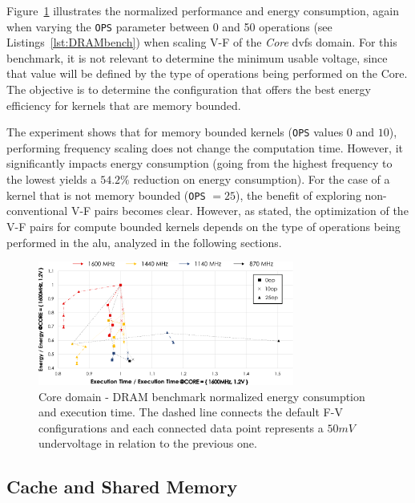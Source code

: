Figure~\ref{fig:DRAM_Corebehaviour} illustrates the normalized performance and energy consumption, again when varying the \texttt{OPS} parameter between 0 and 50 operations (see Listings~\ref{lst:DRAMbench}) when scaling V-F of the \textit{Core} \acrshort{dvfs} domain. For this benchmark, it is not relevant to determine the minimum usable voltage, since that value will be defined by the type of operations being performed on the Core. The objective is to determine the configuration that offers the best energy efficiency for kernels that are memory bounded.  

The experiment shows that for memory bounded kernels (\texttt{OPS} values $0$ and $10$), performing frequency scaling does not change the computation time. However, it significantly impacts energy consumption (going from the highest frequency to the lowest yields a $54.2\%$ reduction on energy consumption). For the case of a kernel that is not memory bounded  (\texttt{OPS} $=25$), the benefit of exploring non-conventional V-F pairs becomes clear. However, as stated, the optimization of the V-F pairs for compute bounded kernels depends on the type of operations being performed in the \acrshort{alu}, analyzed in the following sections.

\begin{figure}[htb]
  \centering
  \includegraphics[width=0.75\textwidth]{Figures/GPU_characterization/DRAM_Core_domain_behaviour.pdf}
  \caption{Core domain - DRAM benchmark normalized energy consumption and execution time. The dashed line connects the default F-V configurations and each connected data point represents a $50mV$ undervoltage in relation to the previous one.}
  \label{fig:DRAM_Corebehaviour}
\end{figure}


\subsection{Cache and Shared Memory}

\label{sec:cache_sm__behaviour}

